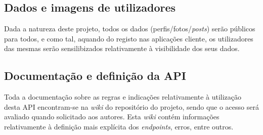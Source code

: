 \subsection{Dados e imagens de utilizadores}
Dada a natureza deste projeto, todos os dados (perfis/fotos/\textit{posts}) serão públicos para todos, e como tal, aquando do registo nas aplicações cliente, os utilizadores das mesmas serão sensilibizados relativamente à visibilidade dos seus dados.

\subsection{Documentação e definição da API}
Toda a documentação sobre as regras e indicações relativamente à utilização desta API encontram-se na \textit{wiki} do repositório do projeto, sendo que o acesso será avaliado quando solicitado aos autores. Esta \textit{wiki} contém informações relativamente à definição mais explícita dos \textit{endpoints}, erros, entre outros.